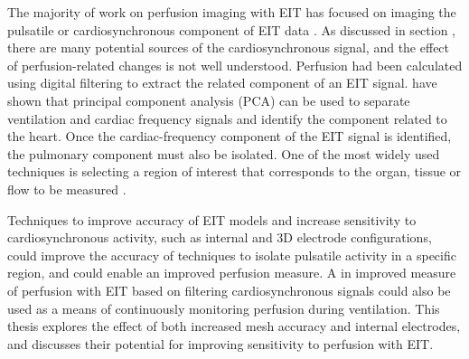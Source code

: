 The majority of work on perfusion imaging with EIT has focused on imaging the pulsatile or 
cardiosynchronous component of EIT data \parencite{nguyen_review_2012}. 
As discussed in section , there are many potential sources of 
the cardiosynchronous signal, and the effect of perfusion-related changes is not well understood. 
Perfusion had been calculated using digital filtering to extract the related component
of an EIT signal. 
 have shown that principal component analysis (PCA) 
can be used to separate ventilation and cardiac frequency signals and identify the component 
related to the heart. Once the cardiac-frequency component of the 
EIT signal is identified, the pulmonary component must also be isolated. 
One of the most widely used techniques 
is selecting a region of interest that corresponds 
to the organ, tissue or flow to be measured
\parencite{braun_accuracy_2018,sola_non-invasive_2011}.

Techniques to improve accuracy of EIT models and increase sensitivity 
to cardiosynchronous activity,
such as internal and 3D electrode configurations, could improve 
the accuracy of techniques to isolate pulsatile
activity in a specific region, and could enable an 
improved perfusion measure. 
A in improved measure of perfusion with EIT based on filtering 
cardiosynchronous signals could also be used as 
a means of continuously monitoring perfusion during ventilation.
This thesis explores the effect of both increased mesh accuracy and internal electrodes,
and discusses their potential for improving sensitivity to perfusion with EIT.
























